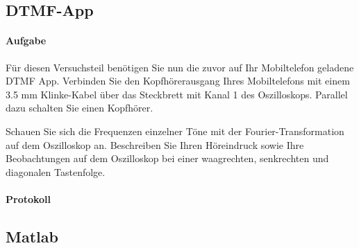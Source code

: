 \documentclass[10pt]{report}
\begin{document}
        \subsection{DTMF-App}
        \paragraph{Aufgabe}
        Für diesen Versuchsteil benötigen Sie nun die zuvor auf Ihr Mobiltelefon geladene \glqq{}DTMF\grqq{} App.
        Verbinden Sie den Kopfhörerausgang Ihres Mobiltelefons mit einem 3.5 mm Klinke-Kabel
        über das Steckbrett mit Kanal 1 des Oszilloskops. Parallel dazu schalten Sie einen Kopfhörer.

        Schauen Sie sich die Frequenzen einzelner Töne mit der Fourier-Transformation auf dem
        Oszilloskop an. Beschreiben Sie Ihren Höreindruck sowie Ihre Beobachtungen auf dem
        Oszilloskop bei einer waagrechten, senkrechten und diagonalen Tastenfolge.
        \paragraph{Protokoll}

        \subsection{Matlab}
\end{document}
